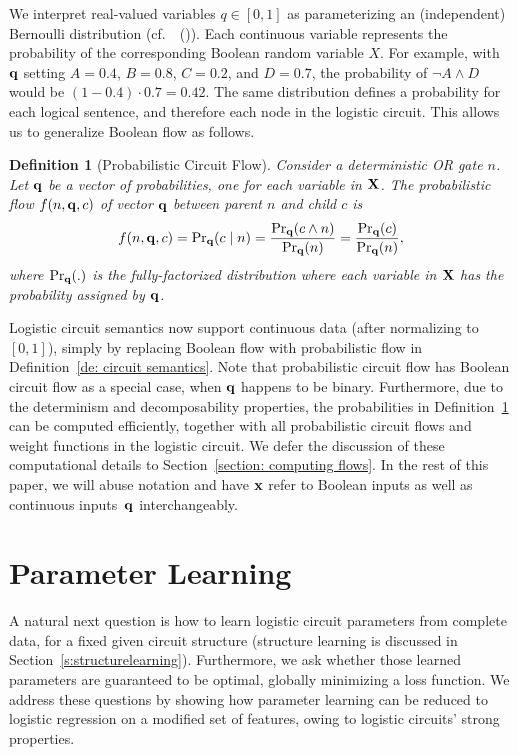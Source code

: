 \documentclass[letterpaper]{article} %
\newtheorem{definition}{Definition}
\newcommand{\sample}{{\bf x}}
\newcommand{\citet}[1]{\citeauthor{#1}~(\citeyear{#1})}
\begin{document}
We interpret real-valued variables $q \in [0,1]$ as parameterizing an (independent) Bernoulli distribution (cf.~\citet{semanticLoss}). Each continuous variable represents the probability of the corresponding Boolean random variable $X$. For example, with $\bf q$ setting $A=0.4$, $B=0.8$, $C=0.2$, and $D=0.7$, the probability of $\neg A \land D$ would be $(1-0.4)\cdot 0.7=0.42$. The same distribution defines a probability for each logical sentence, and therefore each node in the logistic circuit.
This allows us to generalize Boolean flow as follows.

\begin{definition}[Probabilistic Circuit Flow]
\label{definition: probabilistic flow}
Consider a deterministic OR gate $n$.
Let $\bf q$ be a vector of probabilities, one for each variable in $\bf X$.
The probabilistic flow $f(n,{\bf q},c)$ of vector $\bf q$ between parent $n$ and child $c$ is
\begin{align*}
    f(n,{\bf q},c) = {\Pr}_{\bf q}(c \mid n) = \frac{\Pr_{\bf q}(c \land n)}{ \Pr_{\bf q}(n) } = \frac{\Pr_{\bf q}(c)}{ \Pr_{\bf q}(n) },
\end{align*}
where $\Pr_{\bf q}(.)$ is the fully-factorized distribution where each variable in  $\bf X$ has the probability assigned by $\bf q$.
\end{definition}
Logistic circuit semantics now support continuous data (after normalizing to $[0,1]$), simply by replacing Boolean flow with probabilistic flow in Definition~\ref{de: circuit semantics}.
Note that probabilistic circuit flow has Boolean circuit flow as a special case, when ${\bf q}$ happens to be binary.
Furthermore, due to the determinism and decomposability properties, the probabilities in Definition~\ref{definition: probabilistic flow} can be computed efficiently, together with all probabilistic circuit flows and weight functions in the logistic circuit. We defer the discussion of these computational details to Section~\ref{section: computing flows}.
In the rest of this paper, we will abuse notation and have $\sample$ refer to Boolean inputs as well as continuous inputs~${\bf q}$ interchangeably.

\section{Parameter Learning}
\label{section: parameter learning}

A natural next question is how to learn logistic circuit parameters from complete data, for a fixed given circuit structure (structure learning is discussed in Section~\ref{s:structurelearning}). Furthermore, we ask whether those learned parameters are guaranteed to be optimal, globally minimizing a loss function.
We address these questions by showing how parameter learning can be reduced to logistic regression on a modified set of features, owing to logistic circuits' strong properties.
\end{document}
